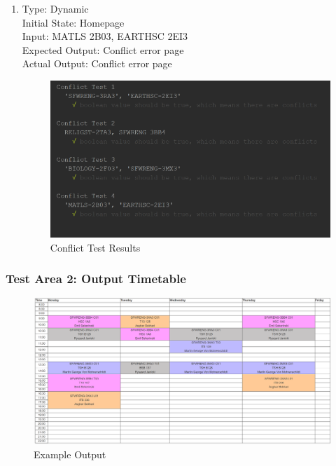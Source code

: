 \documentclass[11pt, oneside]{article}
\begin{document}
\begin{enumerate}
\item Type: Dynamic \\
Initial State: Homepage \\
Input: MATLS 2B03, EARTHSC 2EI3 \\
Expected Output: Conflict error page \\
Actual Output: Conflict error page \\

\begin{figure}[h]
    \centering
    \includegraphics[width=170mm]{CResults.PNG}
    \caption{Conflict Test Results}
    \label{fig:my_label}
\end{figure}
\end{enumerate}



\subsubsection{Test Area 2: Output Timetable}
\begin{figure}[h]
    \centering
    \includegraphics[width=170mm]{Capture.PNG}
    \caption{Example Output}
    \label{fig:my_label}
\end{figure}
\end{document}
